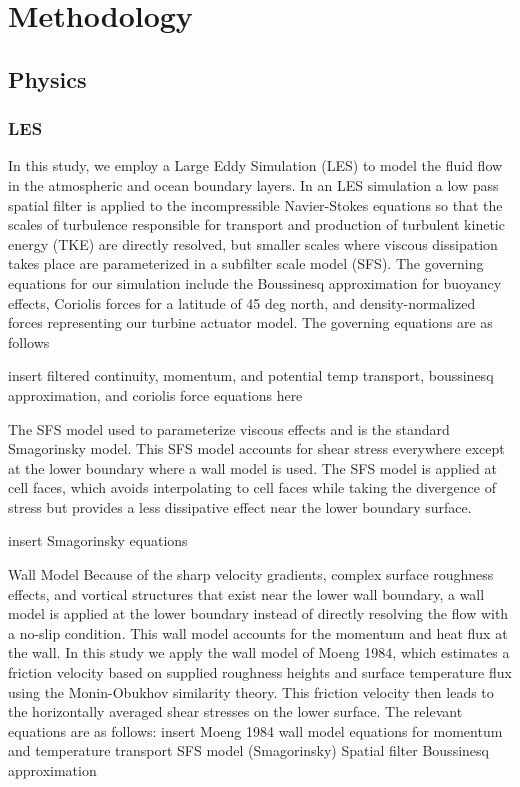 \section{Methodology}

\subsection{Physics}


\subsubsection{LES}
In this study, we employ a Large Eddy Simulation (LES) to model the fluid flow in the atmospheric and ocean boundary layers.  In an LES simulation a low pass spatial filter is applied to the incompressible Navier-Stokes equations so that the scales of turbulence responsible for transport and production of turbulent kinetic energy (TKE) are directly resolved, but smaller scales where viscous dissipation takes place are parameterized in a subfilter scale model (SFS).  The governing equations for our simulation include the Boussinesq approximation for buoyancy effects, Coriolis forces for a latitude of 45 deg north, and density-normalized forces representing our turbine actuator model.  The governing equations are as follows

insert filtered continuity, momentum, and potential temp transport, boussinesq approximation, and coriolis force equations here

The SFS model used to parameterize viscous effects and is the standard Smagorinsky model.  This SFS model accounts for shear stress everywhere except at the lower boundary where a wall model is used.  The SFS model is applied at cell faces, which avoids interpolating to cell faces while taking the divergence of stress but provides a less dissipative effect near the lower boundary surface.  

insert Smagorinsky equations

Wall Model
Because of the sharp velocity gradients, complex surface roughness effects, and vortical structures that exist near the lower wall boundary, a wall model is applied at the lower boundary instead of directly resolving the flow with a no-slip condition.  This wall model accounts for the momentum and heat flux at the wall.  In this study we apply the wall model of Moeng 1984, which estimates a friction velocity based on supplied roughness heights and surface temperature flux using the Monin-Obukhov similarity theory.  This friction velocity then leads to the horizontally averaged shear stresses on the lower surface.  The relevant equations are as follows:
insert Moeng 1984 wall model equations for momentum and temperature transport
SFS model (Smagorinsky)
Spatial filter
Boussinesq approximation

